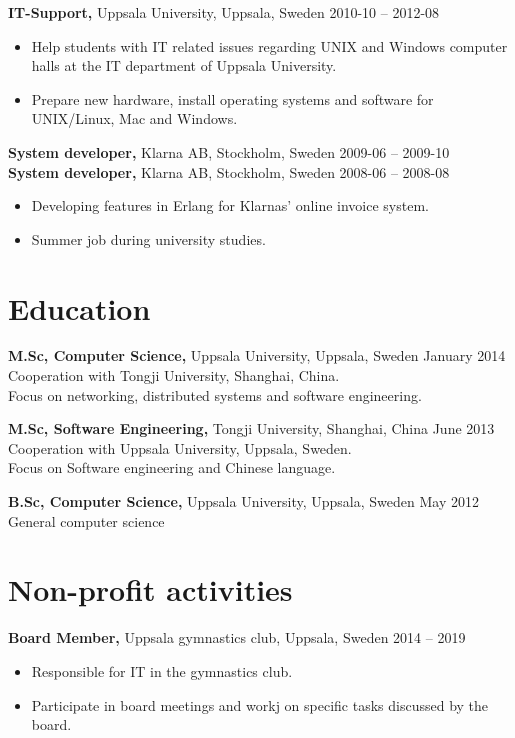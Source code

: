 \documentclass[margin]{res}
\begin{document}
\begin{resume}
{\bf IT-Support,} Uppsala University, Uppsala, Sweden \hfill 2010-10 -- 2012-08
 \begin{itemize} \itemsep -2pt  %
 \item Help students with IT related issues regarding UNIX and Windows
   computer halls at the IT department of Uppsala University.
 \item Prepare new hardware, install operating systems and software for UNIX/Linux, Mac and Windows.
 \end{itemize}

{\bf System developer,} Klarna AB, Stockholm, Sweden \hfill 2009-06 -- 2009-10\\
{\bf System developer,} Klarna AB, Stockholm, Sweden \hfill 2008-06 -- 2008-08
 \begin{itemize} \itemsep -2pt  %
 \item Developing features in Erlang for Klarnas' online invoice system.
 \item Summer job during university studies.
 \end{itemize}

\section{Education}
{\bf M.Sc,  Computer Science,} Uppsala University, Uppsala, Sweden \hfill January 2014 \\
Cooperation with Tongji University, Shanghai, China. \\
Focus on networking, distributed systems and software engineering.

{\bf M.Sc, Software Engineering,} Tongji University, Shanghai, China \hfill June 2013 \\
Cooperation with Uppsala University, Uppsala, Sweden.\\
Focus on Software engineering and Chinese language.

{\bf B.Sc, Computer Science,} Uppsala University, Uppsala, Sweden \hfill May 2012 \\
General computer science

\newpage
\section{Non-profit activities}

{\bf Board Member,} Uppsala gymnastics club, Uppsala, Sweden \hfill 2014 -- 2019
\begin{itemize} \itemsep -2pt
\item Responsible for IT in the gymnastics club.
\item Participate in board meetings and workj on specific tasks discussed by the board.
\end{itemize}


\end{resume}
\end{document}
